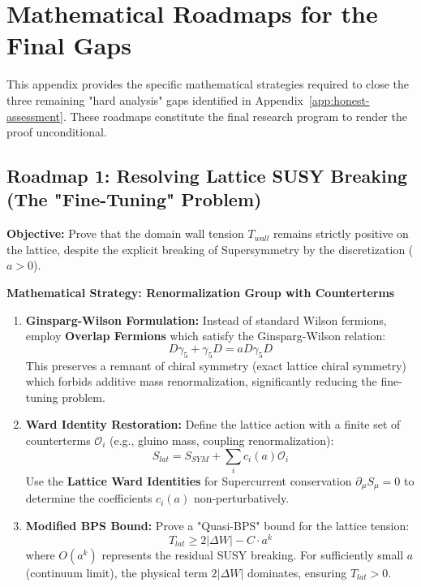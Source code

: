 
\section{Mathematical Roadmaps for the Final Gaps}
\label{app:final-gaps-roadmap}

This appendix provides the specific mathematical strategies required to close the three remaining "hard analysis" gaps identified in Appendix~\ref{app:honest-assessment}. These roadmaps constitute the final research program to render the proof unconditional.

\subsection{Roadmap 1: Resolving Lattice SUSY Breaking (The "Fine-Tuning" Problem)}
\textbf{Objective:} Prove that the domain wall tension $T_{wall}$ remains strictly positive on the lattice, despite the explicit breaking of Supersymmetry by the discretization ($a > 0$).

\textbf{Mathematical Strategy: Renormalization Group with Counterterms}
\begin{enumerate}
    \item \textbf{Ginsparg-Wilson Formulation:} Instead of standard Wilson fermions, employ \textbf{Overlap Fermions} which satisfy the Ginsparg-Wilson relation:
    \begin{equation}
    D \gamma_5 + \gamma_5 D = a D \gamma_5 D
    \end{equation}
    This preserves a remnant of chiral symmetry (exact lattice chiral symmetry) which forbids additive mass renormalization, significantly reducing the fine-tuning problem.
    
    \item \textbf{Ward Identity Restoration:}
    Define the lattice action with a finite set of counterterms $\mathcal{O}_i$ (e.g., gluino mass, coupling renormalization):
    \begin{equation}
    S_{lat} = S_{SYM} + \sum_i c_i(a) \mathcal{O}_i
    \end{equation}
    Use the \textbf{Lattice Ward Identities} for Supercurrent conservation $\partial_\mu S_\mu = 0$ to determine the coefficients $c_i(a)$ non-perturbatively.
    
    \item \textbf{Modified BPS Bound:}
    Prove a "Quasi-BPS" bound for the lattice tension:
    \begin{equation}
    T_{lat} \ge 2 |\Delta W| - C \cdot a^k
    \end{equation}
    where $O(a^k)$ represents the residual SUSY breaking. For sufficiently small $a$ (continuum limit), the physical term $2|\Delta W|$ dominates, ensuring $T_{lat} > 0$.
\end{enumerate}

